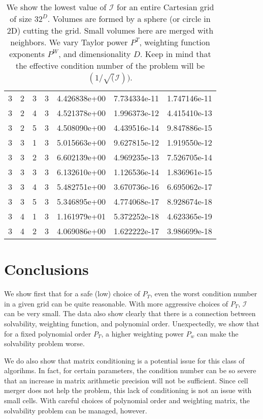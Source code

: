 \documentclass{article}
\newcommand{\cali}{\mathcal{I}}
\begin{document}
\begin{table}
\begin{center}
\begin{tabular}{|cccc|ccc|}
3 & 2 & 3 & 3 & 4.426838e+00 & 7.734334e-11 & 1.747146e-11 \\ 
3 & 2 & 4 & 3 & 4.521378e+00 & 1.996373e-12 & 4.415410e-13 \\ 
3 & 2 & 5 & 3 & 4.508090e+00 & 4.439516e-14 & 9.847886e-15 \\ 
\hline
3 & 3 & 1 & 3 & 5.015663e+00 & 9.627815e-12 & 1.919550e-12 \\ 
3 & 3 & 2 & 3 & 6.602139e+00 & 4.969235e-13 & 7.526705e-14 \\ 
3 & 3 & 3 & 3 & 6.132610e+00 & 1.126536e-14 & 1.836961e-15 \\ 
3 & 3 & 4 & 3 & 5.482751e+00 & 3.670736e-16 & 6.695062e-17 \\ 
3 & 3 & 5 & 3 & 5.346895e+00 & 4.774068e-17 & 8.928674e-18 \\ 
\hline
3 & 4 & 1 & 3 & 1.161979e+01 & 5.372252e-18 & 4.623365e-19 \\ 
3 & 4 & 2 & 3 & 4.069086e+00 & 1.622222e-17 & 3.986699e-18 \\
\hline
\end{tabular}
\end{center}
\label{tab::worst_merged_inv_conv}
\caption
    {
      We show the lowest value of
      $\cali$ for an entire Cartesian grid of size $32^D$.
      Volumes are  formed by a sphere (or circle in 2D) cutting the
      grid.   Small volumes here are merged with neighbors.
      We vary Taylor power $P^T$, weighting
      function exponents $P^W$, and dimensionality $D$. 
      Keep in mind
      that the effective condition number of the problem will be $(1/\sqrt(\cali))$.
    }
\end{table}


\section{Conclusions}

We show first that for a safe (low) choice of
$P_T$, even the worst condition number in a given grid can be quite
reasonable. With more aggressive choices of $P_T$, $\cali$ can be very
small.  The data also
show clearly that there is a connection between solvability, weighting
function, and polynomial order.  Unexpectedly, we show that for a
fixed polynomial order $P_T$, a higher weighting power $P_w$ can make the
solvability problem worse.

We do also show that matrix conditioning is a  potential issue for
this class of algorihms.   In fact, for certain parameters,
the condition number  can be so severe that an
increase in matrix arithmetic precision will not be sufficient.
Since cell merger does not help the
problem, this lack of conditioning is not an issue with small cells.
With careful choices of polynomial order and weighting matrix, the
solvability problem can be managed, however.
\end{document}
